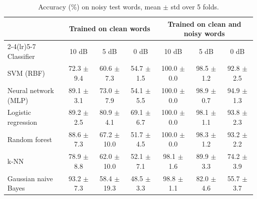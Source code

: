 \begin{table}[H]\centering\small
\caption{Accuracy (\%) on noisy test words, mean $\pm$ std over 5 folds.}\label{tab:noise}
\setlength{\tabcolsep}{2.5pt}\footnotesize\begin{tabular}{lcccccc}\toprule
& \multicolumn{3}{c}{Trained on clean words} & \multicolumn{3}{c}{Trained on clean and noisy words}\\\cmidrule(lr){2-4}\cmidrule(lr){5-7}
Classifier & 10 dB & 5 dB & 0 dB & 10 dB & 5 dB & 0 dB\\\midrule
SVM (RBF) & 72.3 $\pm$ 9.4 & 60.6 $\pm$ 7.3 & 54.7 $\pm$ 1.5 & 100.0 $\pm$ 0.0 & 98.5 $\pm$ 1.2 & 92.8 $\pm$ 2.5\\
Neural network (MLP) & 89.1 $\pm$ 3.1 & 73.0 $\pm$ 7.9 & 54.1 $\pm$ 5.5 & 100.0 $\pm$ 0.0 & 98.9 $\pm$ 0.7 & 94.9 $\pm$ 1.3\\
Logistic regression & 89.2 $\pm$ 2.5 & 80.9 $\pm$ 4.1 & 69.1 $\pm$ 6.7 & 100.0 $\pm$ 0.0 & 98.1 $\pm$ 1.1 & 93.8 $\pm$ 2.3\\
Random forest & 88.6 $\pm$ 7.3 & 67.2 $\pm$ 10.0 & 51.7 $\pm$ 4.5 & 100.0 $\pm$ 0.0 & 98.3 $\pm$ 1.2 & 93.2 $\pm$ 2.2\\
k-NN & 78.9 $\pm$ 8.8 & 62.0 $\pm$ 10.0 & 52.1 $\pm$ 7.1 & 98.1 $\pm$ 1.6 & 89.9 $\pm$ 3.3 & 74.2 $\pm$ 3.9\\
Gaussian naive Bayes & 93.2 $\pm$ 7.3 & 58.4 $\pm$ 19.3 & 48.5 $\pm$ 3.3 & 98.8 $\pm$ 1.1 & 82.0 $\pm$ 4.6 & 55.7 $\pm$ 3.7\\
\bottomrule\end{tabular}\end{table}

